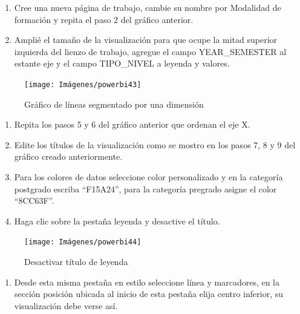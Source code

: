 \documentclass[
]{book}
\providecommand{\tightlist}{%
  \setlength{\itemsep}{0pt}\setlength{\parskip}{0pt}}
\begin{document}
\begin{enumerate}
\def\labelenumi{\arabic{enumi}.}
\item
  Cree una nueva página de trabajo, cambie su nombre por Modalidad de formación y repita el paso 2 del gráfico anterior.
\item
  Amplié el tamaño de la visualización para que ocupe la mitad superior izquierda del lienzo de trabajo, agregue el campo YEAR\_SEMESTER al estante eje y el campo TIPO\_NIVEL a leyenda y valores.
\end{enumerate}

\begin{figure}

{\centering \texttt{[image: Imágenes/powerbi43]} 

}

\caption{Gráfico de líneas segmentado por una dimensión}\label{fig:paso2lineassegmentadobi-fig}
\end{figure}

\begin{enumerate}
\def\labelenumi{\arabic{enumi}.}
\setcounter{enumi}{2}
\item
  Repita los pasos 5 y 6 del gráfico anterior que ordenan el eje X.
\item
  Edite los títulos de la visualización como se mostro en los pasos 7, 8 y 9 del gráfico creado anteriormente.
\item
  Para los colores de datos seleccione color personalizado y en la categoría postgrado escriba ``F15A24'', para la categoría pregrado asigne el color ``8CC63F''.
\item
  Haga clic sobre la pestaña leyenda y desactive el título.
\end{enumerate}

\begin{figure}

{\centering \texttt{[image: Imágenes/powerbi44]} 

}

\caption{Desactivar título de leyenda}\label{fig:paso6lineassegmentadobi-fig}
\end{figure}

\begin{enumerate}
\def\labelenumi{\arabic{enumi}.}
\setcounter{enumi}{6}
\tightlist
\item
  Desde esta misma pestaña en estilo seleccione línea y marcadores, en la sección posición ubicada al inicio de esta pestaña elija centro inferior, su visualización debe verse así.
\end{enumerate}
\end{document}
